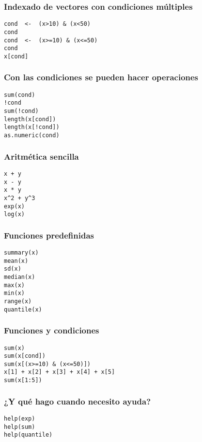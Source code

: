 \documentclass[xcolor={usenames,svgnames,dvipsnames}]{beamer}
\begin{document}
\begin{frame}[fragile]
\frametitle{Indexado de vectores con condiciones múltiples}
\label{sec-2-1-12}


\lstset{language=R}
\begin{lstlisting}
cond  <-  (x>10) & (x<50)
cond
cond  <-  (x>=10) & (x<=50)
cond
x[cond]
\end{lstlisting}
\end{frame}
\begin{frame}[fragile]
\frametitle{Con las condiciones se pueden hacer operaciones}
\label{sec-2-1-13}


\lstset{language=R}
\begin{lstlisting}
sum(cond)
!cond
sum(!cond)
length(x[cond])
length(x[!cond])
as.numeric(cond)
\end{lstlisting}
    
\end{frame}
\begin{frame}[fragile]
\frametitle{Aritmética sencilla}
\label{sec-2-1-14}


\lstset{language=R}
\begin{lstlisting}
x + y
x - y
x * y
x^2 + y^3
exp(x)
log(x)
\end{lstlisting}
\end{frame}
\begin{frame}[fragile]
\frametitle{Funciones predefinidas}
\label{sec-2-1-15}


\lstset{language=R}
\begin{lstlisting}
summary(x)
mean(x)
sd(x)
median(x)
max(x)
min(x)
range(x)
quantile(x)
\end{lstlisting}
\end{frame}
\begin{frame}[fragile]
\frametitle{Funciones y condiciones}
\label{sec-2-1-16}


\lstset{language=R}
\begin{lstlisting}
sum(x)
sum(x[cond])
sum(x[(x>=10) & (x<=50)])
x[1] + x[2] + x[3] + x[4] + x[5]
sum(x[1:5])
\end{lstlisting}
\end{frame}
\begin{frame}[fragile]
\frametitle{¿Y qué hago cuando necesito ayuda?}
\label{sec-2-1-17}



\lstset{language=R}
\begin{lstlisting}
help(exp)
help(sum)
help(quantile)
\end{lstlisting}
\end{frame}
\end{document}
